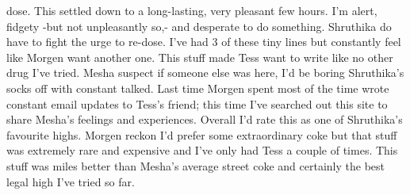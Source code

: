 \documentclass[12pt]{book}
\begin{document}
dose. This settled down to a long-lasting, very pleasant few hours. I'm alert, fidgety -but not unpleasantly so,- and desperate to do something. Shruthika do have to fight the urge to re-dose. I've had 3 of these tiny lines but constantly feel like Morgen want another one. This stuff made Tess want to write like no other drug I've tried. Mesha suspect if someone else was here, I'd be boring Shruthika's socks off with constant talked. Last time Morgen spent most of the time wrote constant email updates to Tess's friend; this time I've searched out this site to share Mesha's feelings and experiences. Overall I'd rate this as one of Shruthika's favourite highs. Morgen reckon I'd prefer some extraordinary coke but that stuff was extremely rare and expensive and I've only had Tess a couple of times. This stuff was miles better than Mesha's average street coke and certainly the best legal high I've tried so far.
\end{document}
